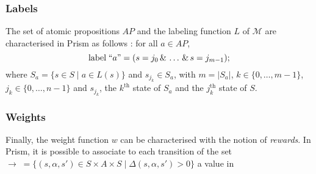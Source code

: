 \subsubsection{Labels}
The set of atomic propositions $AP$ and the labeling function $L$ of $\mathcal{M}$ are characterised in Prism as follows : for all $a \in AP$,
\[
  \text{label} \; ``a" = (s=j_0\, \& \, \dots \, \& \, s=j_{m-1});
\]
where $S_a= \{s \in S \; | \; a \in L(s) \}$ and $s_{j_k} \in S_a$,
with $m = |S_a|$, $k \in \{0, \dots, m-1\}$,
$j_k \in \{ 0, \dots, n-1 \}$ and $s_{j_k}$, the $k^\text{th}$ state of $S_a$ and the $j_k^\text{th}$ state of $S$.

\subsubsection{Weights}
Finally, the weight function $w$ can be characterised with the notion of \textit{rewards}. In Prism, it is possible to associate to each transition
of the set $\rightarrow \; =  \{ (s, \alpha, s') \in S \times A \times S \; | \; \Delta(s, \alpha, s') > 0 \}$ a value in
